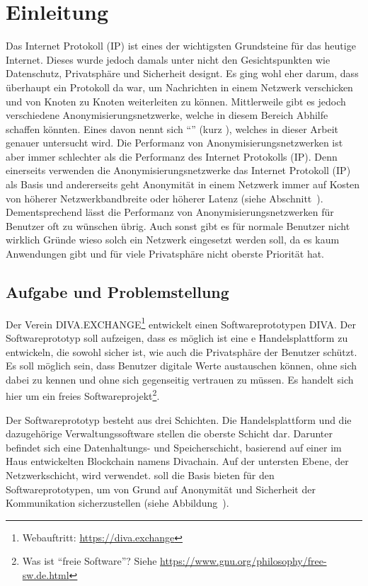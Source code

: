 \chapter{Einleitung}
\label{ch:Einleitung}

Das Internet Protokoll (IP) ist eines der wichtigsten Grundsteine für das heutige Internet.
Dieses wurde jedoch damals unter nicht den Gesichtspunkten wie Datenschutz, Privatsphäre und Sicherheit designt.
Es ging wohl eher darum, dass überhaupt ein Protokoll da war, um Nachrichten in einem Netzwerk verschicken und von Knoten zu Knoten weiterleiten zu können.
Mittlerweile gibt es jedoch verschiedene Anonymisierungsnetzwerke, welche in diesem Bereich Abhilfe schaffen könnten.
Eines davon nennt sich ``'' (kurz ), welches in dieser Arbeit genauer untersucht wird.
Die Performanz von Anonymisierungsnetzwerken ist aber immer schlechter als die Performanz des Internet Protokolls (IP).
Denn einerseits verwenden die Anonymisierungsnetzwerke das Internet Protokoll (IP) als Basis und andererseits geht Anonymität in einem Netzwerk immer auf Kosten von höherer Netzwerkbandbreite oder höherer Latenz (siehe Abschnitt~).
Dementsprechend lässt die Performanz von Anonymisierungsnetzwerken für Benutzer oft zu wünschen übrig.
Auch sonst gibt es für normale Benutzer nicht wirklich Gründe wieso solch ein Netzwerk eingesetzt werden soll,
da es kaum Anwendungen gibt und für viele Privatsphäre nicht oberste Priorität hat.

\section{Aufgabe und Problemstellung}\label{sec:aufgabe}

Der Verein DIVA.EXCHANGE\footnote{Webauftritt: \url{https://diva.exchange}} entwickelt einen Softwareprototypen DIVA.
Der Softwareprototyp soll aufzeigen, dass es möglich ist eine e Handelsplattform zu entwickeln,
die sowohl sicher ist, wie auch die Privatsphäre der Benutzer schützt.
Es soll möglich sein, dass Benutzer digitale Werte austauschen können, ohne sich dabei zu kennen und ohne sich gegenseitig vertrauen zu müssen.
Es handelt sich hier um ein freies Softwareprojekt\footnote{Was ist ``freie Software''? Siehe \url{https://www.gnu.org/philosophy/free-sw.de.html}}.

Der Softwareprototyp besteht aus drei Schichten.
Die Handelsplattform und die dazugehörige Verwaltungssoftware stellen die oberste Schicht dar.
Darunter befindet sich eine Datenhaltungs- und Speicherschicht, basierend auf einer im Haus entwickelten Blockchain namens Divachain.
Auf der untersten Ebene, der Netzwerkschicht, wird  verwendet.
 soll die Basis bieten für den Softwareprototypen, um von Grund auf Anonymität und Sicherheit der Kommunikation sicherzustellen (siehe Abbildung~).

